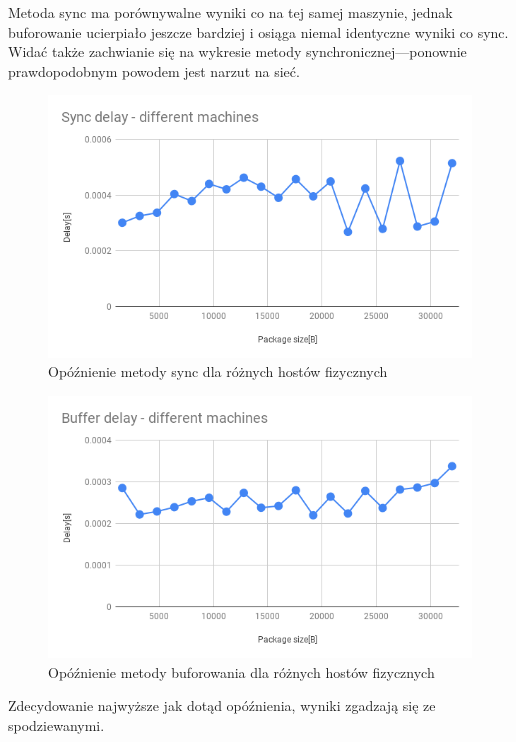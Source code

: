 \documentclass[11pt]{article}
\begin{document}
    Metoda sync ma porównywalne wyniki co na tej samej maszynie, jednak buforowanie ucierpiało jeszcze bardziej i osiąga
    niemal identyczne wyniki co sync.
    Widać także zachwianie się na wykresie metody synchronicznej---ponownie prawdopodobnym powodem jest narzut na sieć.

    \begin{figure}[H]
        \includegraphics[width=1\textwidth,frame]{charts/Sync delay - different machines.png}
        \caption{Opóźnienie metody sync dla różnych hostów fizycznych}
        \label{fig:sync-diff-delay}
    \end{figure}
    \begin{figure}[H]
        \includegraphics[width=1\textwidth,frame]{charts/Buffer delay - different machines.png}
        \caption{Opóźnienie metody buforowania dla różnych hostów fizycznych}
        \label{fig:buff-diff-delay}
    \end{figure}

    Zdecydowanie najwyższe jak dotąd opóźnienia, wyniki zgadzają się ze spodziewanymi.
    \clearpage
\end{document}
